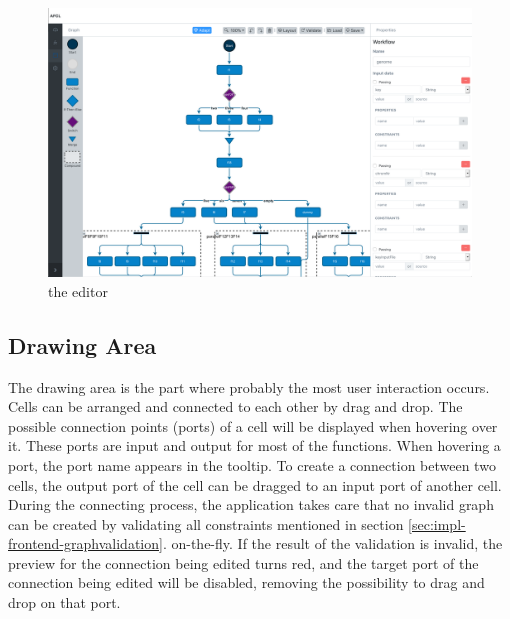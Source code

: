 \documentclass[a4paper,top=25mm,bottom=25mm,12pt,pdftex,halfparskip,twoside,bibtotoc,numbers=noenddot]{scrbook}
\begin{document}
\begin{figure}[H]
  \centering
  \includegraphics[width=\textwidth]{editor}
  \caption{the editor}
  \label{fig:editor}
\end{figure}

\subsection{Drawing Area}

The drawing area is the part where probably the most user interaction occurs.\\ Cells can be arranged and connected to each other by drag and drop.
The possible connection points (ports) of a cell will be displayed when hovering over it. These ports are input and output for most of the functions.
When hovering a port, the port name appears in the tooltip.
To create a connection between two cells, the output port of the cell can be dragged to an input port of another cell.\\
During the connecting process, the application takes care that no invalid graph can be created by validating all constraints mentioned in section \ref{sec:impl-frontend-graphvalidation}. on-the-fly. If the result of the validation is invalid, the preview for the connection being edited turns red, and the target port of the connection being edited will be disabled, removing the possibility to drag and drop on that port.
\end{document}
